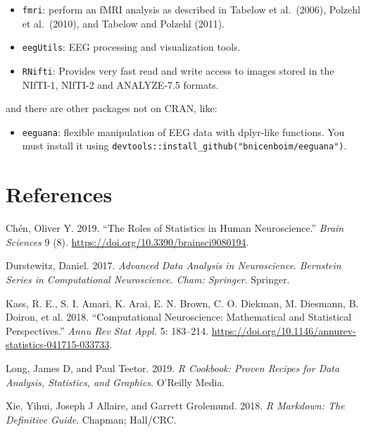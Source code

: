\documentclass[
]{article}
\providecommand{\tightlist}{%
  \setlength{\itemsep}{0pt}\setlength{\parskip}{0pt}}
\newlength{\cslhangindent}
\newlength{\cslentryspacingunit} %
\newenvironment{CSLReferences}[2] %
 {%
  \setlength{\parindent}{0pt}
  \ifodd #1
  \let\oldpar\par
  \def\par{\hangindent=\cslhangindent\oldpar}
  \fi
  \setlength{\parskip}{#2\cslentryspacingunit}
 }%
 {}
\begin{document}
\begin{itemize}
\tightlist
\item
  \texttt{fmri}: perform an fMRI analysis as described in Tabelow et
  al.~(2006), Polzehl et al.~(2010), and Tabelow and Polzehl (2011).
\item
  \texttt{eegUtils}: EEG processing and visualization tools.
\item
  \texttt{RNifti}: Provides very fast read and write access to images
  stored in the NIfTI-1, NIfTI-2 and ANALYZE-7.5 formats.
\end{itemize}

and there are other packages not on CRAN, like:

\begin{itemize}
\tightlist
\item
  \texttt{eeguana}: flexible manipulation of EEG data with dplyr-like
  functions. You must install it using
  \texttt{devtools::install\_github("bnicenboim/eeguana")}.
\end{itemize}

\hypertarget{references}{%
\section*{References}\label{references}}

\hypertarget{refs}{}
\begin{CSLReferences}{1}{0}
\leavevmode{}%
Chén, Oliver Y. 2019. {``The Roles of Statistics in Human
Neuroscience.''} \emph{Brain Sciences} 9 (8).
\url{https://doi.org/10.3390/brainsci9080194}.

\leavevmode{}%
Durstewitz, Daniel. 2017. \emph{Advanced Data Analysis in Neuroscience}.
\emph{Bernstein Series in Computational Neuroscience. Cham: Springer}.
Springer.

\leavevmode{}%
Kass, R. E., S. I. Amari, K. Arai, E. N. Brown, C. O. Diekman, M.
Diesmann, B. Doiron, et al. 2018. {``Computational Neuroscience:
Mathematical and Statistical Perspectives.''} \emph{Annu Rev Stat Appl.}
5: 183--214.
\url{https://doi.org/10.1146/annurev-statistics-041715-033733}.

\leavevmode{}%
Long, James D, and Paul Teetor. 2019. \emph{R Cookbook: Proven Recipes
for Data Analysis, Statistics, and Graphics}. O'Reilly Media.

\leavevmode{}%
Xie, Yihui, Joseph J Allaire, and Garrett Grolemund. 2018. \emph{R
Markdown: The Definitive Guide}. Chapman; Hall/CRC.

\end{CSLReferences}
\end{document}
